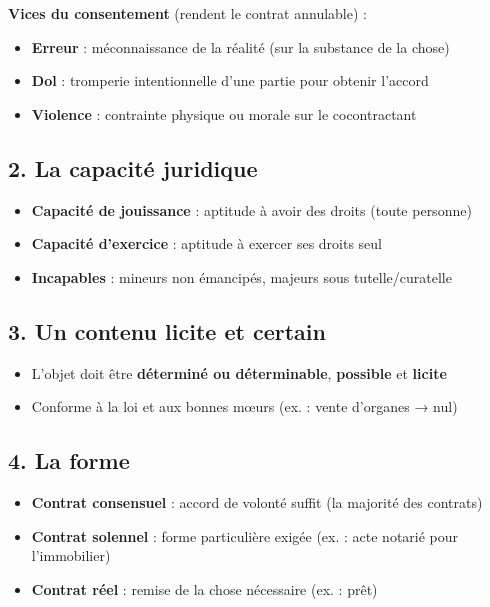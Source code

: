 \documentclass[11pt,a4paper]{article}
\begin{document}
\textbf{Vices du consentement} (rendent le contrat annulable) :
\begin{itemize}
  \item \textbf{Erreur} : méconnaissance de la réalité (sur la substance de la chose)
  \item \textbf{Dol} : tromperie intentionnelle d'une partie pour obtenir l'accord
  \item \textbf{Violence} : contrainte physique ou morale sur le cocontractant
\end{itemize}

\subsection*{2. La capacité juridique}
\begin{itemize}
  \item \textbf{Capacité de jouissance} : aptitude à avoir des droits (toute personne)
  \item \textbf{Capacité d'exercice} : aptitude à exercer ses droits seul
  \item \textbf{Incapables} : mineurs non émancipés, majeurs sous tutelle/curatelle
\end{itemize}

\subsection*{3. Un contenu licite et certain}
\begin{itemize}
  \item L'objet doit être \textbf{déterminé ou déterminable}, \textbf{possible} et \textbf{licite}
  \item Conforme à la loi et aux bonnes mœurs (ex. : vente d'organes → nul)
\end{itemize}

\subsection*{4. La forme}
\begin{itemize}
  \item \textbf{Contrat consensuel} : accord de volonté suffit (la majorité des contrats)
  \item \textbf{Contrat solennel} : forme particulière exigée (ex. : acte notarié pour l'immobilier)
  \item \textbf{Contrat réel} : remise de la chose nécessaire (ex. : prêt)
\end{itemize}
\end{document}
